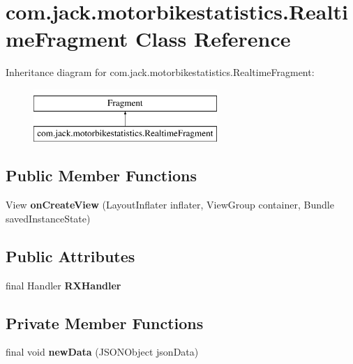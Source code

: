 \hypertarget{classcom_1_1jack_1_1motorbikestatistics_1_1_realtime_fragment}{}\section{com.\+jack.\+motorbikestatistics.\+Realtime\+Fragment Class Reference}
\label{classcom_1_1jack_1_1motorbikestatistics_1_1_realtime_fragment}
Inheritance diagram for com.\+jack.\+motorbikestatistics.\+Realtime\+Fragment\+:\begin{figure}[H]
\begin{center}
\leavevmode
\includegraphics[height=2.000000cm]{classcom_1_1jack_1_1motorbikestatistics_1_1_realtime_fragment}
\end{center}
\end{figure}
\subsection*{Public Member Functions}
\begin{DoxyCompactItemize}
\item 
\mbox{\label{classcom_1_1jack_1_1motorbikestatistics_1_1_realtime_fragment_a68850ca4bf4eabcdf4ed4005d5f0d4d7}} 
View {\bfseries on\+Create\+View} (Layout\+Inflater inflater, View\+Group container, Bundle saved\+Instance\+State)
\end{DoxyCompactItemize}
\subsection*{Public Attributes}
\begin{DoxyCompactItemize}
\item 
final Handler {\bfseries R\+X\+Handler}
\end{DoxyCompactItemize}
\subsection*{Private Member Functions}
\begin{DoxyCompactItemize}
\item 
\mbox{\label{classcom_1_1jack_1_1motorbikestatistics_1_1_realtime_fragment_a675832561a8d63214b8f2cd59e901de5}} 
final void {\bfseries new\+Data} (J\+S\+O\+N\+Object json\+Data)
\end{DoxyCompactItemize}
